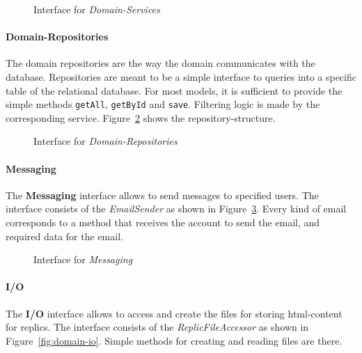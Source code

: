 \begin{figure}
    \centering

    \caption{Interface for \textit{Domain-Services}}
    \label{fig:domain-services}
\end{figure}

\paragraph{Domain-Repositories}\label{par:domain-repositories}
The domain repositories are the way the domain communicates with the database. \newline
Repositories are meant to be a simple interface to queries into a specific table of the relational database.
For most models, it is sufficient to provide the simple methods \texttt{getAll}, \texttt{getById} and \texttt{save}.
Filtering logic is made by the corresponding service.
Figure~\ref{fig:domain-repositories} shows the repository-structure.

\begin{figure}
    \centering

    \caption{Interface for \textit{Domain-Repositories}}
    \label{fig:domain-repositories}
\end{figure}

\paragraph{Messaging}
The \textbf{Messaging} interface allows to send messages to specified users.
The interface consists of the \textit{EmailSender} as shown in Figure~\ref{fig:domain-messaging}.
Every kind of email corresponds to a method that receives the account to send the email, and required data for the email.

\begin{figure}
    \centering

    \caption{Interface for \textit{Messaging}}
    \label{fig:domain-messaging}
\end{figure}

\paragraph{I/O}\label{par:io}
The \textbf{I/O} interface allows to access and create the files for storing html-content for replics.
The interface consists of the \textit{ReplicFileAccessor} as shown in Figure~\ref{fig:domain-io}.
Simple methods for creating and reading files are there.

